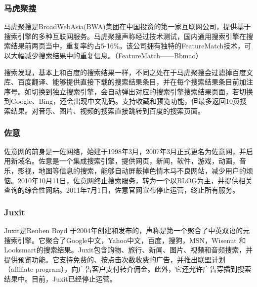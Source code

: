 \subsubsection{马虎聚搜}
马虎聚搜是BroadWebAsia(BWA)集团在中国投资的第一家互联网公司，提供基于搜索引擎的多种互联网服务。马虎聚搜声称经过技术测试，国内通用搜索引擎在搜索结果前两页当中，重复率约占5-16\%。该公司拥有独特的FeatureMatch技术，可以大幅减少搜索结果中的重复信息。（FeatureMatch——Bbmao）

搜索发现，基本上和百度的搜索结果一样，不同之处在于马虎聚搜会过滤掉百度文库、百度翻译、能够提供直接下载的搜索结果条目，并在每个搜索结果条目前加注序号。如切换到独立搜索引擎，会自动弹出对应的搜索引擎搜索结果页面，若切换到Google、Bing，还会出现中文乱码。支持收藏和预览功能，但最多返回10页搜索结果。对音乐、图片、视频的搜索直接跳转到百度的搜索页面。

\subsubsection{佐意}
佐意网的前身是一佐网络，始建于1998年3月，2007年3月正式更名为佐意网，并启用新域名。佐意是一个集成搜索引擎，提供网页，新闻，软件，游戏，动画，音乐，影视，地图等信息的搜索，能够自动屏蔽掉色情木马不良网站，减少用户的烦恼。2010年10月11日，佐意网终止搜索服务，转为一个以BLOG为主，并提供相关查询的综合性网站。2011年7月1日，佐意官网宣布停止运营，终止所有服务。

\subsubsection{Juxit}
Juxit是Reuben Boyd 于2004年创建和发布的，声称是第一个聚合了中英双语的元搜索引擎。它聚合了Google中文，Yahoo中文，百度，搜狗，MSN，Wisenut 和 Looksmart的搜索结果。Juxit包含购物、旅行、新闻、图片、视频和音频搜索，并提供预览功能。它支持免费的、按点击次数收费的广告，并推出联盟计划（affiliate program），向广告客户支付转介佣金。此外，它还允许广告穿插到搜索结果中。目前，Juxit已经停止运营。

